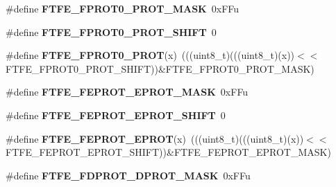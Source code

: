 \begin{DoxyCompactItemize}
\item 
\#define {\bfseries F\+T\+F\+E\+\_\+\+F\+P\+R\+O\+T0\+\_\+\+P\+R\+O\+T\+\_\+\+M\+A\+SK}~0x\+F\+Fu\hypertarget{group__FTFE__Register__Masks_gadeb846e611d1e77100baf8db858ae32c}{}\label{group__FTFE__Register__Masks_gadeb846e611d1e77100baf8db858ae32c}

\item 
\#define {\bfseries F\+T\+F\+E\+\_\+\+F\+P\+R\+O\+T0\+\_\+\+P\+R\+O\+T\+\_\+\+S\+H\+I\+FT}~0\hypertarget{group__FTFE__Register__Masks_gab968ce0cba033b854ff5ae5a5fbe2f34}{}\label{group__FTFE__Register__Masks_gab968ce0cba033b854ff5ae5a5fbe2f34}

\item 
\#define {\bfseries F\+T\+F\+E\+\_\+\+F\+P\+R\+O\+T0\+\_\+\+P\+R\+OT}(x)~(((uint8\+\_\+t)(((uint8\+\_\+t)(x))$<$$<$F\+T\+F\+E\+\_\+\+F\+P\+R\+O\+T0\+\_\+\+P\+R\+O\+T\+\_\+\+S\+H\+I\+FT))\&F\+T\+F\+E\+\_\+\+F\+P\+R\+O\+T0\+\_\+\+P\+R\+O\+T\+\_\+\+M\+A\+SK)\hypertarget{group__FTFE__Register__Masks_ga70a43ff9a877173f40765cb1f334567e}{}\label{group__FTFE__Register__Masks_ga70a43ff9a877173f40765cb1f334567e}

\item 
\#define {\bfseries F\+T\+F\+E\+\_\+\+F\+E\+P\+R\+O\+T\+\_\+\+E\+P\+R\+O\+T\+\_\+\+M\+A\+SK}~0x\+F\+Fu\hypertarget{group__FTFE__Register__Masks_ga40c56d65eabafe8b67bf9e28a1ab2856}{}\label{group__FTFE__Register__Masks_ga40c56d65eabafe8b67bf9e28a1ab2856}

\item 
\#define {\bfseries F\+T\+F\+E\+\_\+\+F\+E\+P\+R\+O\+T\+\_\+\+E\+P\+R\+O\+T\+\_\+\+S\+H\+I\+FT}~0\hypertarget{group__FTFE__Register__Masks_gaf93b562d4d3aa274707f0cd10d19a3b3}{}\label{group__FTFE__Register__Masks_gaf93b562d4d3aa274707f0cd10d19a3b3}

\item 
\#define {\bfseries F\+T\+F\+E\+\_\+\+F\+E\+P\+R\+O\+T\+\_\+\+E\+P\+R\+OT}(x)~(((uint8\+\_\+t)(((uint8\+\_\+t)(x))$<$$<$F\+T\+F\+E\+\_\+\+F\+E\+P\+R\+O\+T\+\_\+\+E\+P\+R\+O\+T\+\_\+\+S\+H\+I\+FT))\&F\+T\+F\+E\+\_\+\+F\+E\+P\+R\+O\+T\+\_\+\+E\+P\+R\+O\+T\+\_\+\+M\+A\+SK)\hypertarget{group__FTFE__Register__Masks_gadb8d52e77c8b850fe0dd6f751645ea63}{}\label{group__FTFE__Register__Masks_gadb8d52e77c8b850fe0dd6f751645ea63}

\item 
\#define {\bfseries F\+T\+F\+E\+\_\+\+F\+D\+P\+R\+O\+T\+\_\+\+D\+P\+R\+O\+T\+\_\+\+M\+A\+SK}~0x\+F\+Fu\hypertarget{group__FTFE__Register__Masks_ga04902a698b747ed3e15ec54795ea38ce}{}\label{group__FTFE__Register__Masks_ga04902a698b747ed3e15ec54795ea38ce}


\end{DoxyCompactItemize}

